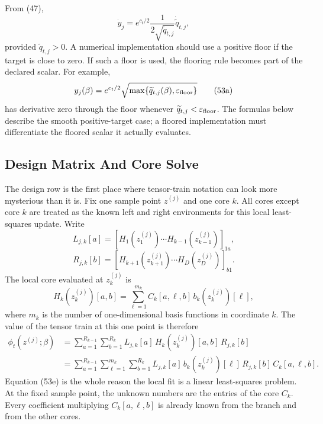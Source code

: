 \documentclass[11pt]{article}
\theoremstyle{remark}
\begin{document}
From (47),
\[
    \dot y_j
    =
    e^{c_t/2}
    \frac{1}{2\sqrt{\widetilde q_{t,j}}}
    \dot{\widetilde q}_{t,j},
    \tag{53}
\]
provided \(\widetilde q_{t,j}>0\).  A numerical implementation should use a
positive floor if the target is close to zero.  If such a floor is used, the
flooring rule becomes part of the declared scalar.  For example,
\[
    y_j(\beta)
    =
    e^{c_t/2}\sqrt{\max\{\widetilde q_{t,j}(\beta),\varepsilon_{\rm floor}\}}
    \tag{53a}
\]
has derivative zero through the floor whenever
\(\widetilde q_{t,j}<\varepsilon_{\rm floor}\).  The formulas below describe
the smooth positive-target case; a floored implementation must differentiate
the floored scalar it actually evaluates.

\subsection{Design Matrix And Core Solve}

The design row is the first place where tensor-train notation can look more
mysterious than it is.  Fix one sample point \(z^{(j)}\) and one core \(k\).
All cores except core \(k\) are treated as the known left and right
environments for this local least-squares update.  Write
\[
    L_{j,k}[a]
    =
    \left[
    H_{1}(z_1^{(j)})\cdots H_{k-1}(z_{k-1}^{(j)})
    \right]_{1a},
    \tag{53b}
\]
\[
    R_{j,k}[b]
    =
    \left[
    H_{k+1}(z_{k+1}^{(j)})\cdots H_D(z_D^{(j)})
    \right]_{b1}.
    \tag{53c}
\]
The local core evaluated at \(z_k^{(j)}\) is
\[
    H_k(z_k^{(j)})[a,b]
    =
    \sum_{\ell=1}^{m_k}
    C_k[a,\ell,b]\,b_k(z_k^{(j)})[\ell],
    \tag{53d}
\]
where \(m_k\) is the number of one-dimensional basis functions in coordinate
\(k\).  The value of the tensor train at this one point is therefore
\[
\begin{aligned}
    \phi_t(z^{(j)};\beta)
    &=
    \sum_{a=1}^{R_{k-1}}
    \sum_{b=1}^{R_k}
    L_{j,k}[a]\,H_k(z_k^{(j)})[a,b]\,R_{j,k}[b]\\
    &=
    \sum_{a=1}^{R_{k-1}}
    \sum_{\ell=1}^{m_k}
    \sum_{b=1}^{R_k}
    L_{j,k}[a]\,
    b_k(z_k^{(j)})[\ell]\,
    R_{j,k}[b]\,
    C_k[a,\ell,b].
\end{aligned}
    \tag{53e}
\]
Equation (53e) is the whole reason the local fit is a linear least-squares
problem.  At the fixed sample point, the unknown numbers are the entries of
the core \(C_k\).  Every coefficient multiplying \(C_k[a,\ell,b]\) is already
known from the branch and from the other cores.
\end{document}
